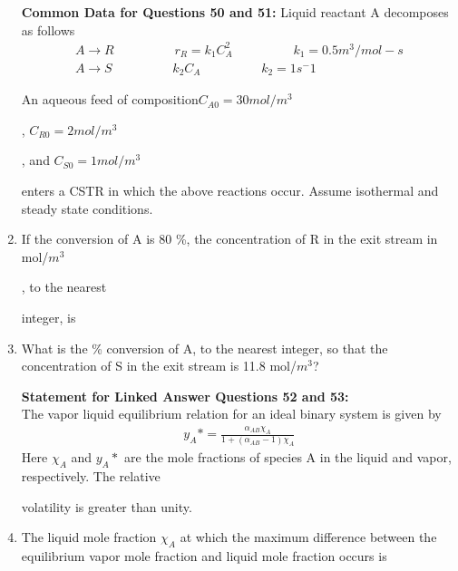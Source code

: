 \documentclass[journal,12pt,onecolumn]{IEEEtran}
\theoremstyle{remark}
\begin{document}
\begin{enumerate}
\textbf{Common Data for Questions 50 and 51:}
Liquid reactant A decomposes as follows
\begin{align*}
	A\rightarrow R \hspace{2cm} r_R=k_1C_A^2 \hspace{2cm} k_1 = 0.5m^3/mol-s \\
	A\rightarrow S \hspace{2cm} k_2C_A \hspace{2cm} k_2 = 1s^-1
\end{align*}

An aqueous feed of composition$C_{A0} =30 mol/m^3$

, $C_{R0} = 2 mol/m^3$

, and $C_{S0}= 1 mol/m^3$

enters a CSTR in which the above reactions occur. Assume isothermal and steady state conditions.

\item If the conversion of A is 80 \%, the concentration of R in the exit stream in mol/$m^3$

, to the nearest

integer, is  \underline{\hspace{2cm}}

\item What is the \% conversion of A, to the nearest integer, so that the concentration of S in the exit stream is 11.8 mol/$m^3$?  \underline{\hspace{2cm}}



\textbf{Statement for Linked Answer Questions 52 and 53:} \\ 
The vapor liquid equilibrium relation for an ideal binary system is given by 
\begin{align*}
	y_A * = \frac{\alpha_{AB}\chi_A}{1+(\alpha_{AB}-1)\chi_A}
\end{align*}
Here $\chi_A$ and $y_A *$ are the mole fractions of species A in the liquid and vapor, respectively. The relative

volatility is greater than unity.

\item The liquid mole fraction $\chi_A$ at which the maximum difference between the equilibrium vapor mole
fraction and liquid mole fraction occurs is
   \begin{enumerate}
\end{enumerate}


\end{enumerate}
\end{document}

